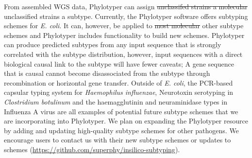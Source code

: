 \documentclass{bioinfo}
\providecommand{\DIFadd}[1]{{\protect\color{red}#1}} %
\providecommand{\DIFdel}[1]{{\protect\color{red}\sout{#1}}}                      %
\providecommand{\DIFaddbegin}{} %
\providecommand{\DIFaddend}{} %
\providecommand{\DIFdelbegin}{} %
\providecommand{\DIFdelend}{} %
\begin{document}
From assembled WGS data, Phylotyper can assign \DIFdelbegin \DIFdel{unclassifed strains a molecular }\DIFdelend \DIFaddbegin \DIFadd{unclassified strains a }\DIFaddend subtype.
Currently\DIFaddbegin \DIFadd{, }\DIFaddend the Phylotyper software offers subtyping schemes for \textit{E. coli}.
It can, however, be applied to \DIFdelbegin \DIFdel{most molecular }\DIFdelend \DIFaddbegin \DIFadd{other }\DIFaddend subtype schemes and Phylotyper includes functionality to build new schemes.
\DIFaddbegin \DIFadd{Phylotyper can produce predicted subtypes from any input sequence that is strongly correlated with the subtype distribution, however, input sequences with a direct biological causal link to the subtype will have fewer caveats; A gene sequence that is causal cannot become disassociated from the subtype through recombination or horizontal gene transfer.
Outside of }\textit{\DIFadd{E. coli}}\DIFadd{, the PCR-based capsular typing system for }\textit{\DIFadd{Haemophilus influenzae}}\DIFadd{, Neurotoxin serotyping in }\textit{\DIFadd{Clostridium botulinum}} \DIFadd{and the haemagglutinin and neuraminidase types in Influenza A virus are all examples of potential future subtype schemes that we are incorporating into Phylotyper.
We plan on expanding the Phylotyper resource by adding and updating high-quality subtype schemes for other pathogens.
We encourage users to contact us with their new subtype schemes or updates to schemes (}\url{https://github.com/superphy/insilico-subtyping}\DIFadd{).
}\DIFaddend 
\end{document}
